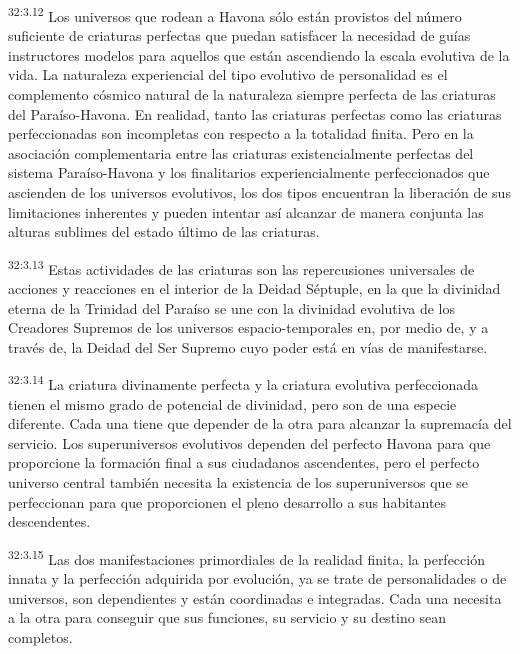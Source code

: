 \par
\textsuperscript{32:3.12} Los universos que rodean a Havona sólo están provistos del número suficiente de criaturas perfectas que puedan satisfacer la necesidad de guías instructores modelos para aquellos que están ascendiendo la escala evolutiva de la vida. La naturaleza experiencial del tipo evolutivo de personalidad es el complemento cósmico natural de la naturaleza siempre perfecta de las criaturas del Paraíso-Havona. En realidad, tanto las criaturas perfectas como las criaturas perfeccionadas son incompletas con respecto a la totalidad finita. Pero en la asociación complementaria entre las criaturas existencialmente perfectas del sistema Paraíso-Havona y los finalitarios experiencialmente perfeccionados que ascienden de los universos evolutivos, los dos tipos encuentran la liberación de sus limitaciones inherentes y pueden intentar así alcanzar de manera conjunta las alturas sublimes del estado último de las criaturas.

\par
\textsuperscript{32:3.13} Estas actividades de las criaturas son las repercusiones universales de acciones y reacciones en el interior de la Deidad Séptuple, en la que la divinidad eterna de la Trinidad del Paraíso se une con la divinidad evolutiva de los Creadores Supremos de los universos espacio-temporales en, por medio de, y a través de, la Deidad del Ser Supremo cuyo poder está en vías de manifestarse.

\par
\textsuperscript{32:3.14} La criatura divinamente perfecta y la criatura evolutiva perfeccionada tienen el mismo grado de potencial de divinidad, pero son de una especie diferente. Cada una tiene que depender de la otra para alcanzar la supremacía del servicio. Los superuniversos evolutivos dependen del perfecto Havona para que proporcione la formación final a sus ciudadanos ascendentes, pero el perfecto universo central también necesita la existencia de los superuniversos que se perfeccionan para que proporcionen el pleno desarrollo a sus habitantes descendentes.

\par
\textsuperscript{32:3.15} Las dos manifestaciones primordiales de la realidad finita, la perfección innata y la perfección adquirida por evolución, ya se trate de personalidades o de universos, son dependientes y están coordinadas e integradas. Cada una necesita a la otra para conseguir que sus funciones, su servicio y su destino sean completos.

